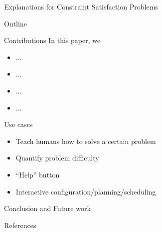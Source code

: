 \documentclass{beamer}
\begin{document}
\begin{frame}{Explanations for Constraint Satisfaction Problems}

\end{frame}


\begin{frame}{Outline}

\end{frame}


\begin{frame}{Contributions}
    \vfill
    In this paper, we
    \vfill
    \begin{itemize}
        \item ... 
        \item ... 
        \item ... 
        \item ... 
    \end{itemize}
    \vfill
\end{frame}

\begin{frame}{Use cases}
    \begin{itemize}
        \item Teach humans how to solve a certain problem
        \item Quantify problem difficulty
        \item ``Help'' button
        \item Interactive configuration/planning/scheduling
    \end{itemize}
\end{frame}

\begin{frame}{Conclusion and Future work}

\end{frame}

\begin{frame}{References}
\end{frame}
\end{document}
